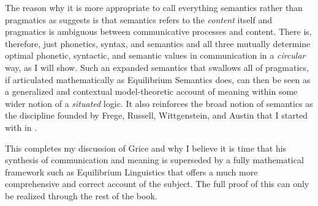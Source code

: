 
The reason why it is more appropriate to call everything semantics rather than pragmatics as \citet[Section~4]{carston:lcspd} suggests is that semantics refers to the \emph{content} itself and pragmatics is ambiguous between communicative processes and content. There is, therefore, just phonetics, syntax, and semantics and all three mutually determine optimal phonetic, syntactic, and semantic values in communication in a \emph{circular} way, as I will show. Such an expanded semantics that swallows all of pragmatics, if articulated mathematically as Equilibrium Semantics does, can then be seen as a generalized and contextual model-theoretic account of meaning within some wider notion of a \emph{situated} logic. It also reinforces the broad notion of semantics as the discipline founded by Frege,  Russell, Wittgenstein, and Austin  that I started with in .

This completes my discussion of Grice and why I believe it is time that his synthesis of communication and meaning is superseded by a fully mathematical framework such as Equilibrium Linguistics that offers a much more comprehensive and correct account of the subject. The full proof of this can only be realized through the rest of the book.



